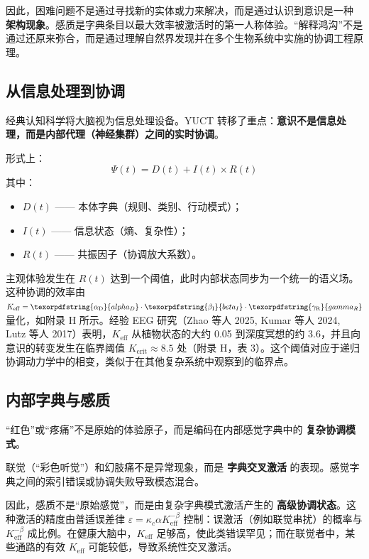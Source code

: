 \documentclass[12pt,a4paper]{article}
\DeclareRobustCommand{\alD}{\texorpdfstring{\ensuremath{\alpha_{\mathrm{D}}}}{alpha_D}}
\DeclareRobustCommand{\beI}{\texorpdfstring{\ensuremath{\beta_{\mathrm{I}}}}{beta_I}}
\DeclareRobustCommand{\gaR}{\texorpdfstring{\ensuremath{\gamma_{\mathrm{R}}}}{gamma_R}}
\newcommand{\eff}{\mathrm{eff}}
\newcommand{\Ke}{K_{\eff}}
\newcommand{\Kcrit}{K_{\mathrm{crit}}}
\begin{document}
	因此，困难问题不是通过寻找新的实体或力来解决，而是通过认识到意识是一种 \textbf{架构现象}。感质是字典条目以最大效率被激活时的第一人称体验。“解释鸿沟”不是通过还原来弥合，而是通过理解自然界发现并在多个生物系统中实施的协调工程原理。
	
	\subsection{从信息处理到协调}
	
	经典认知科学将大脑视为信息处理设备。YUCT 转移了重点：\textbf{意识不是信息处理，而是内部代理（神经集群）之间的实时协调}。
	
	形式上：
	\[
	\Psi(t) = D(t) + I(t) \times R(t)
	\]
	其中：
	\begin{itemize}
		\item $D(t)$ —— 本体字典（规则、类别、行动模式）；
		\item $I(t)$ —— 信息状态（熵、复杂性）；
		\item $R(t)$ —— 共振因子（协调放大系数）。
	\end{itemize}
	
	主观体验发生在 $R(t)$ 达到一个阈值，此时内部状态同步为一个统一的语义场。这种协调的效率由 $\Ke = \alD \cdot \beI \cdot \gaR$ 量化，如附录 H 所示。经验 EEG 研究（Zhao 等人 2025, Kumar 等人 2024, Lutz 等人 2017）表明，$\Ke$ 从植物状态的大约 0.05 到深度冥想的约 3.6，并且向意识的转变发生在临界阈值 $\Kcrit \approx 8.5$ 处（附录 H，表 3）。这个阈值对应于递归协调动力学中的相变，类似于在其他复杂系统中观察到的临界点。
	
	\subsection{内部字典与感质}
	
	“红色”或“疼痛”不是原始的体验原子，而是编码在内部感觉字典中的 \textbf{复杂协调模式}。
	
	\begin{tcolorbox}[title=例：联觉与幻肢痛]
		联觉（“彩色听觉”）和幻肢痛不是异常现象，而是 \textbf{字典交叉激活} 的表现。感觉字典之间的索引错误或协调失败导致模态混合。
	\end{tcolorbox}
	
	因此，感质不是“原始感觉”，而是由复杂字典模式激活产生的 \textbf{高级协调状态}。这种激活的精度由普适误差律 $\varepsilon = \kappa_c \alpha \Ke^{-\beta}$ 控制：误激活（例如联觉串扰）的概率与 $\Ke^{-\beta}$ 成比例。在健康大脑中，$\Ke$ 足够高，使此类错误罕见；而在联觉者中，某些通路的有效 $\Ke$ 可能较低，导致系统性交叉激活。
	
\end{document}
